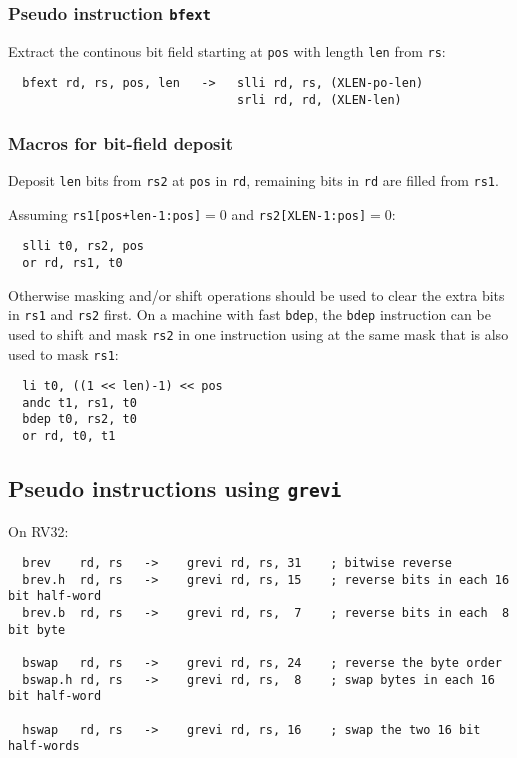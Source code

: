 \subsubsection{Pseudo instruction {\tt bfext}}

Extract the continous bit field starting at {\tt pos} with length {\tt len}
from {\tt rs}:

\begin{verbatim}
  bfext rd, rs, pos, len   ->   slli rd, rs, (XLEN-po-len)
                                srli rd, rd, (XLEN-len)
\end{verbatim}

\subsubsection{Macros for bit-field deposit}

Deposit {\tt len} bits from {\tt rs2} at {\tt pos} in {\tt rd}, remaining bits
in {\tt rd} are filled from {\tt rs1}.

Assuming {\tt rs1[pos+len-1:pos]}$=$0 and {\tt rs2[XLEN-1:pos]}$=$0:

\begin{verbatim}
  slli t0, rs2, pos
  or rd, rs1, t0
\end{verbatim}

Otherwise masking and/or shift operations should be used to clear the extra
bits in {\tt rs1} and {\tt rs2} first. On a machine with fast {\tt bdep},
the {\tt bdep} instruction can be used to shift and mask {\tt rs2} in one
instruction using at the same mask that is also used to mask {\tt rs1}:

\begin{verbatim}
  li t0, ((1 << len)-1) << pos
  andc t1, rs1, t0
  bdep t0, rs2, t0
  or rd, t0, t1
\end{verbatim}

\subsection{Pseudo instructions using {\tt grevi}}

On RV32:

\begin{verbatim}
  brev    rd, rs   ->    grevi rd, rs, 31    ; bitwise reverse
  brev.h  rd, rs   ->    grevi rd, rs, 15    ; reverse bits in each 16 bit half-word
  brev.b  rd, rs   ->    grevi rd, rs,  7    ; reverse bits in each  8 bit byte

  bswap   rd, rs   ->    grevi rd, rs, 24    ; reverse the byte order
  bswap.h rd, rs   ->    grevi rd, rs,  8    ; swap bytes in each 16 bit half-word

  hswap   rd, rs   ->    grevi rd, rs, 16    ; swap the two 16 bit half-words
\end{verbatim}

